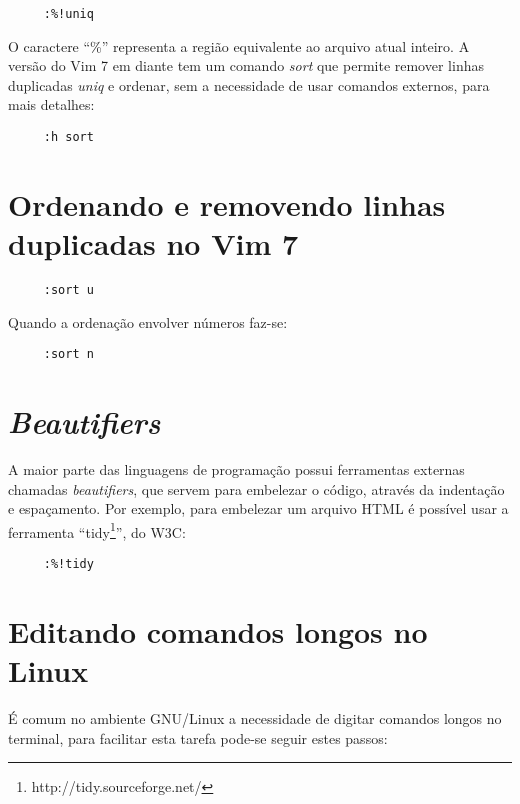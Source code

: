 \begin{verbatim}
     :%!uniq
\end{verbatim}

O caractere ``\%'' representa a região equivalente ao arquivo atual inteiro.
A versão do Vim 7 em diante tem um comando {\em sort} que permite remover
linhas duplicadas {\em uniq} e ordenar, sem a necessidade de usar comandos
externos, para mais detalhes:

\begin{verbatim}
     :h sort
\end{verbatim}

\section{Ordenando e removendo linhas duplicadas no Vim 7}

\begin{verbatim}
     :sort u
\end{verbatim}

Quando a ordenação envolver números faz-se:

\begin{verbatim}
     :sort n
\end{verbatim}

\section{{\em Beautifiers}}

A maior parte das linguagens de programação possui ferramentas
externas chamadas {\em beautifiers}, que servem para embelezar o código,
através da indentação e espaçamento. Por exemplo, para embelezar um
arquivo HTML é possível usar a ferramenta ``tidy\footnote{http://tidy.sourceforge.net/}'', do W3C:

\begin{verbatim}
     :%!tidy
\end{verbatim}

\section{Editando comandos longos no Linux}
\label{Editando comandos longos no Linux}

É comum no ambiente GNU/Linux a necessidade de digitar comandos longos
no terminal, para facilitar esta tarefa pode-se seguir estes passos:

